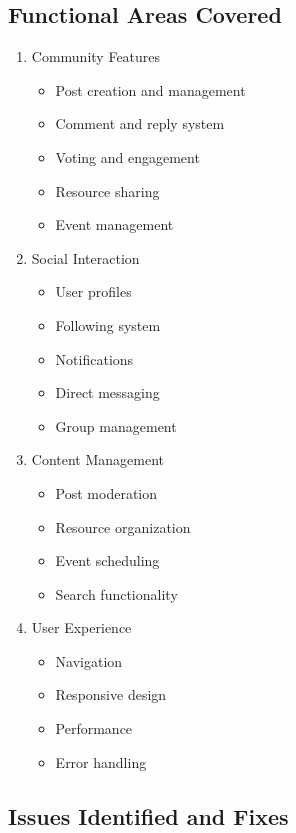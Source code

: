 \subsection{Functional Areas Covered}

\begin{enumerate}
    \item Community Features
    \begin{itemize}
        \item Post creation and management
        \item Comment and reply system
        \item Voting and engagement
        \item Resource sharing
        \item Event management
    \end{itemize}
    
    \item Social Interaction
    \begin{itemize}
        \item User profiles
        \item Following system
        \item Notifications
        \item Direct messaging
        \item Group management
    \end{itemize}
    
    \item Content Management
    \begin{itemize}
        \item Post moderation
        \item Resource organization
        \item Event scheduling
        \item Search functionality
    \end{itemize}
    
    \item User Experience
    \begin{itemize}
        \item Navigation
        \item Responsive design
        \item Performance
        \item Error handling
    \end{itemize}
\end{enumerate}

\subsection{Issues Identified and Fixes}

